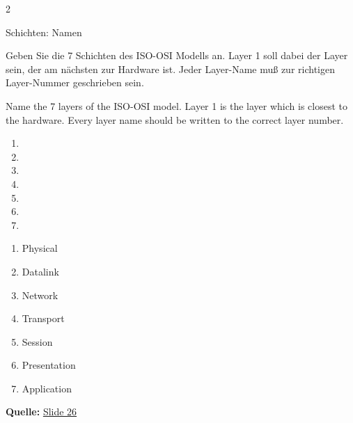 \documentclass{../../../../sty/adam-exam-v1.1}
\date{11. 02. 2026}
\begin{document}
\begin{copies}{2}

\makeexam

\begin{question}{Schichten: Namen}
{%
Geben Sie die 7 Schichten des ISO-OSI Modells an. Layer 1 soll dabei der Layer sein,
der am nächsten zur Hardware ist. Jeder Layer-Name muß zur richtigen Layer-Nummer geschrieben sein.

Name the 7 layers of the ISO-OSI model. Layer 1 is the layer which is closest to the hardware.
Every layer name should be written to the correct layer number.
\bigskip\bigskip
}
{%
\begin{enumerate}
\item  {}
\item  {}
\item  {}
\item  {}
\item  {}
\item  {}
\item  {}
\end{enumerate}
}
{%
\vspace*{-0.3cm}
\begin{enumerate}
\item \cb Physical
\item \cb Datalink
\item \cb Network
\item \cb Transport
\item \cb Session
\item \cb Presentation
\item \cb Application
\end{enumerate}
\vspace*{-0.3cm}


\textbf{Quelle:} \href{https://iuk.one/1010-1009.pdf\#page=26}{Slide 26}
}
\end{question}


\emptypage\emptypage
\adjustfordoublesidedprinting

\end{copies}
\end{document}
